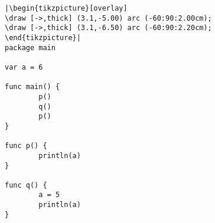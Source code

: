 \begin{lstlisting}[linewidth=.5\textwidth,caption=Global scope]
|\begin{tikzpicture}[overlay]
\draw [->,thick] (3.1,-5.00) arc (-60:90:2.00cm);
\draw [->,thick] (3.1,-6.50) arc (-60:90:2.20cm);
\end{tikzpicture}|
package main

var a = 6

func main() {
        p()
        q()
        p()
}

func p() {
        println(a)
}

func q() {
        a = 5
        println(a)
}
\end{lstlisting}
